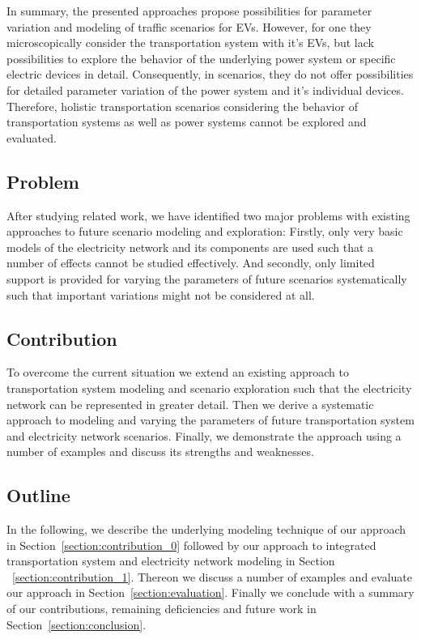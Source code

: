 In summary, the presented approaches propose possibilities for parameter variation and modeling of traffic scenarios for EVs. However, for one they microscopically consider the transportation system with it's EVs, but lack possibilities to explore the behavior of the underlying power system or specific electric devices in detail. Consequently, in scenarios, they do not offer possibilities for detailed parameter variation of the power system and it's individual devices. Therefore, holistic transportation scenarios considering the behavior of transportation systems as well as power systems cannot be explored and evaluated.

\subsection{Problem}
After studying related work, we have identified two major problems with existing approaches to future scenario modeling and exploration: Firstly, only very basic models of the electricity network and its components are used such that a number of effects cannot be studied effectively. And secondly, only limited support is provided for varying the parameters of future scenarios systematically such that important variations might not be considered at all.
\subsection{Contribution}
To overcome the current situation we extend an existing approach to transportation system modeling and scenario exploration such that the electricity network can be represented in greater detail. Then we derive a systematic approach to modeling and varying the parameters of future transportation system and electricity network scenarios. Finally, we demonstrate the approach using a number of examples and discuss its strengths and weaknesses.

\subsection{Outline}

In the following, we describe the underlying modeling technique of our approach in Section~\ref{section:contribution_0} followed by our approach to integrated transportation system and electricity network modeling in Section ~\ref{section:contribution_1}. Thereon we discuss a number of examples and evaluate our approach in Section~\ref{section:evaluation}. Finally we conclude with a summary of our contributions, remaining deficiencies and future work in Section~\ref{section:conclusion}.
